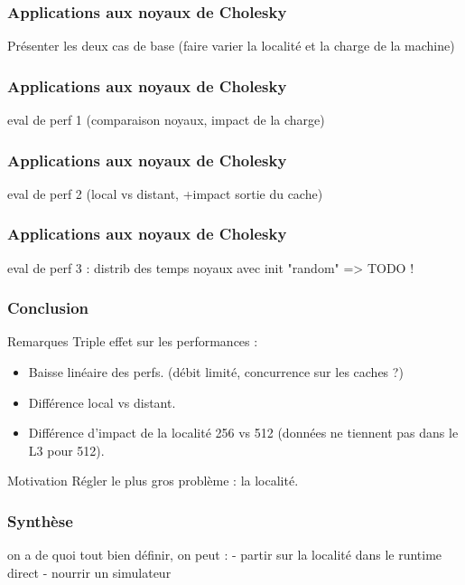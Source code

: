 \documentclass[xcolor={usenames,dvipsnames,svgnames,table}, aspectratio=43]{beamer}
\begin{document}
\begin{frame}
\frametitle{Applications aux noyaux de Cholesky}

Présenter les deux cas de base (faire varier la localité et la charge de la machine)

\end{frame}

\begin{frame}
\frametitle{Applications aux noyaux de Cholesky}

eval de perf 1 (comparaison noyaux, impact de la charge)

\end{frame}

\begin{frame}
\frametitle{Applications aux noyaux de Cholesky}

eval de perf 2 (local vs distant, +impact sortie du cache)

\end{frame}

\begin{frame}
\frametitle{Applications aux noyaux de Cholesky}

eval de perf 3 : distrib des temps noyaux avec init "random" => TODO !

\end{frame}

\begin{frame}
  \frametitle{Conclusion}
  \begin{block}{Remarques}
    Triple effet sur les performances :
    \begin{itemize}
      \item Baisse linéaire des perfs. (débit limité, concurrence sur les caches ?)
      \item Différence local vs distant.
      \item Différence d'impact de la localité 256 vs 512 (données ne tiennent pas dans le L3 pour 512).
    \end{itemize}
  \end{block}

  \begin{block}{Motivation}
    Régler le plus gros problème : la localité.
  \end{block}

\end{frame}

\begin{frame}
\frametitle{Synthèse}

on a de quoi tout bien définir, on peut :
- partir sur la localité dans le runtime direct
- nourrir un simulateur

\end{frame}
\end{document}
